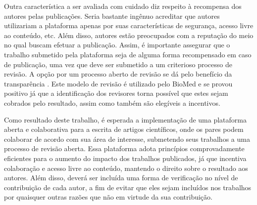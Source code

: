 Outra característica a ser avaliada com cuidado diz respeito à recompensa dos autores pelas publicações. Seria bastante ingênuo acreditar que autores utilizariam a plataforma apenas por suas características de segurança, acesso livre ao conteúdo, etc. Além disso, autores estão preocupados com a reputação do meio no qual buscam efetuar a publicação. Assim, é importante assegurar que o trabalho submetido pela plataforma seja de alguma forma recompensado em caso de publicação, uma vez que deve ser submetido a um criterioso processo de revisão. A opção por um processo aberto de revisão se dá pelo benefício da transparência \cite{InteractivePeerReview2010}. Este modelo de revisão é utilizado pelo BioMed e se provou positivo já que a identificação dos revisores torna possível que estes sejam cobrados pelo resultado, assim como também são elegíveis a incentivos.

Como resultado deste trabalho, é esperada a implementação de uma plataforma aberta e colaborativa para a escrita de artigos científicos, onde os pares podem colaborar de acordo com sua área de interesse, submetendo seus trabalhos a uma processo de revisão aberta. Essa plataforma adota princípios comprovadamente eficientes para o aumento do impacto dos trabalhos publicados, já que incentiva colaboração e acesso livre ao conteúdo, mantendo o direito sobre o resultado aos autores. Além disso, deverá ser incluída uma forma de verificação no nível de contribuição de cada autor, a fim de evitar que eles sejam incluídos nos trabalhos por quaisquer outras razões \cite{Stealing1993} que não em virtude da sua contribuição.